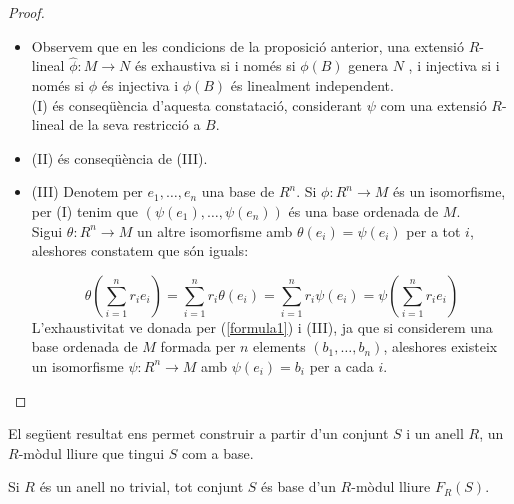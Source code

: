 \begin{proof} 
\begin{itemize}
\item
Observem que en les condicions de la proposició anterior, una extensió $R$-lineal $\hat{\phi}:M\rightarrow N$ és exhaustiva si i només si $\phi(B)$ genera $N$ , i injectiva si i només si $\phi$ és injectiva i $\phi(B)$ és linealment independent. \\
(I) és conseqüència d'aquesta constatació, considerant $\psi$ com una extensió $R$-lineal de la seva restricció a $B$.
\item (II) és conseqüència de (III). 
\item (III) Denotem per $e_1 , \dots , e_n $  una base de $R^n$. Si $\phi : R^n \rightarrow M$ és un isomorfisme, per (I) tenim que $(\psi (e_1),\dots , \psi (e_n))$ és una base ordenada de $M$. \\  Sigui $\theta : R^n \rightarrow M$ un altre isomorfisme amb $\theta (e_i) = \psi (e_i)$ per a tot $i$, aleshores constatem que són iguals:

$$
\theta \left( \sum_{i=1}^n r_ie_i \right)=
\sum_{i=1}^n r_i  \theta (e_i) =
\sum_{i=1}^n r_i \psi (e_i)
= \psi \left( \sum_{i=1}^n r_i e_i \right)
$$
L'exhaustivitat ve donada per (\ref{formula1}) i (III), ja que si considerem una base ordenada de $M$ formada per $n$ elements $(b_1 , \dots , b_n )$, aleshores existeix un isomorfisme $\psi: R^n \rightarrow M$ amb $\psi (e_i)=b_i$ per a cada $i$.

\end{itemize}
\end{proof}

El següent resultat ens permet construir a partir d'un conjunt $S$ i un anell $R$, un $R$-mòdul lliure que tingui $S$ com a base.
 
\begin{prop} 
Si $R$ és un anell no trivial, tot conjunt $S$ és base d'un $R$-mòdul lliure $F_R(S)$.
\end{prop}

